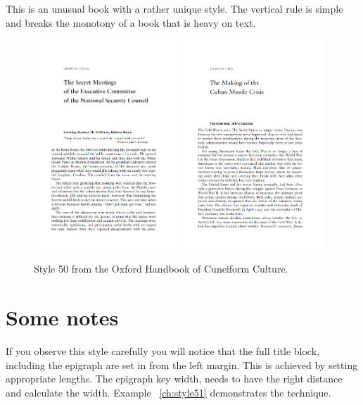 This is an unusual book with a rather unique style. The vertical rule is simple and breaks the monotony of a book that is heavy on text.
\begin{figure}[ht]
\includegraphics[width=0.48\textwidth]{./chapters/chapter51}\hfill
\includegraphics[width=0.48\textwidth]{./chapters/chapter51a}
\caption{Style 50 from the Oxford Handbook of Cuneiform Culture.}
\end{figure}

\section{Some notes}

If you observe this style carefully you will notice that the full title block, including the epigraph are set in from the left margin. This is achieved by setting appropriate  lengths. The epigraph key width, needs to have the right distance and calculate the width. Example~ \ref{ch:style51} demonstrates the technique.

